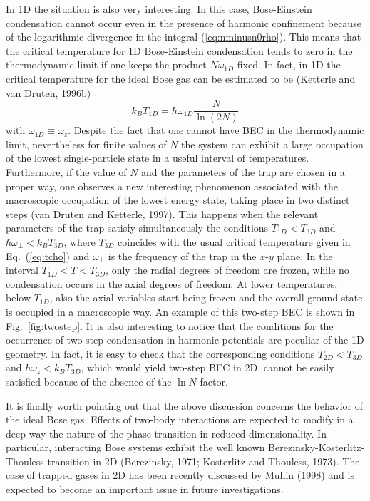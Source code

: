 In 1D the situation is also very interesting. In this case,
Bose-Einstein condensation cannot occur even in the presence of 
harmonic confinement 
because of the logarithmic  divergence in the integral
(\ref{eq:nminusn0rho}).  This means that the
critical temperature  for 1D Bose-Einstein condensation
tends to zero in  the thermodynamic limit if one keeps the product
$N\omega_{1D}$ fixed. In fact, in 1D the critical temperature for the
ideal  Bose gas can be estimated to be (Ketterle and van Druten, 1996b)
\begin{equation}
k_B T_{1D} = \hbar\omega_{1D} \frac{N}{\ln (2 N)}  
\label{eq:t1d}
\end{equation}
with $\omega_{1D}\equiv \omega_z$. 
Despite the fact that one cannot have BEC in the thermodynamic limit,
nevertheless for finite values of $N$ the system  can exhibit a
large occupation of the lowest single-particle state in a useful
interval of temperatures. Furthermore, if the value of $N$ and the 
parameters of the trap are chosen in a proper way, one observes a new 
interesting phenomenon  associated with the macroscopic occupation of 
the lowest energy state, taking place in two distinct steps (van 
Druten and Ketterle, 1997).  This happens when the relevant
parameters of the trap satisfy simultaneously the conditions
$T_{1D} < T_{3D}$ and $\hbar \omega_{\perp} < k_B T_{3D}$, where
$T_{3D}$ coincides with the usual critical temperature  given
in Eq.~(\ref{eq:tcho}) and $\omega_\perp$ is the frequency of the trap
in the  $x$-$y$ plane.  In the interval $T_{1D} < T < T_{3D}$, only 
the radial degrees of freedom are frozen,
while no condensation occurs in the axial degrees of freedom. 
At lower temperatures, below $T_{1D}$, also the axial variables
start being frozen and the overall ground state is  occupied in
a macroscopic way.  An example of this two-step BEC is shown in
Fig.~\ref{fig:twostep}. It is also interesting to  notice that the
conditions for the occurrence of two-step condensation in harmonic
potentials are peculiar of the 1D geometry. In fact, it is easy to
check that the corresponding conditions $T_{2D} < T_{3D}$ and
$\hbar \omega_{z} <  k_B T_{3D}$, which would yield two-step BEC
in 2D, cannot be easily satisfied because of the absence
of the $\ln N$ factor.

It is finally worth pointing out that the above discussion
concerns the behavior of the ideal Bose gas. Effects of two-body
interactions are expected to modify in a deep way the nature of
the phase transition in reduced dimensionality. In particular,
interacting Bose systems exhibit the well known 
Berezinsky-Kosterlitz-Thouless transition in 2D (Berezinsky,
1971;  Kosterlitz and Thouless, 1973).  The case of trapped gases in 
2D has been recently discussed by Mullin (1998) and is expected to 
become an important issue in future investigations.


